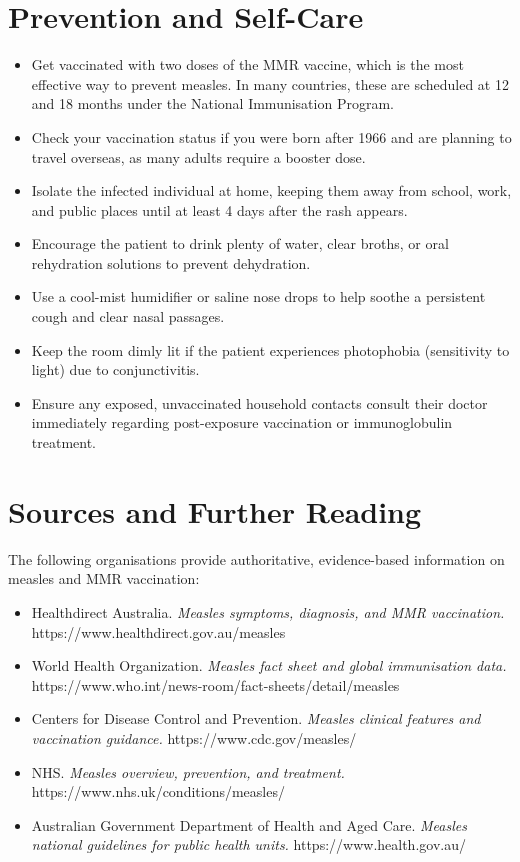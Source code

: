 \section*{Prevention and Self-Care}
\begin{itemize}
    \item Get vaccinated with two doses of the MMR vaccine, which is the most effective way to prevent measles. In many countries, these are scheduled at 12 and 18 months under the National Immunisation Program.
    \item Check your vaccination status if you were born after 1966 and are planning to travel overseas, as many adults require a booster dose.
    \item Isolate the infected individual at home, keeping them away from school, work, and public places until at least 4 days after the rash appears.
    \item Encourage the patient to drink plenty of water, clear broths, or oral rehydration solutions to prevent dehydration.
    \item Use a cool-mist humidifier or saline nose drops to help soothe a persistent cough and clear nasal passages.
    \item Keep the room dimly lit if the patient experiences photophobia (sensitivity to light) due to conjunctivitis.
    \item Ensure any exposed, unvaccinated household contacts consult their doctor immediately regarding post-exposure vaccination or immunoglobulin treatment.
\end{itemize}

\section*{Sources and Further Reading}
The following organisations provide authoritative, evidence-based information on measles and MMR vaccination:
\begin{itemize}
    \item Healthdirect Australia. \textit{Measles symptoms, diagnosis, and MMR vaccination.} https://www.healthdirect.gov.au/measles
    \item World Health Organization. \textit{Measles fact sheet and global immunisation data.} https://www.who.int/news-room/fact-sheets/detail/measles
    \item Centers for Disease Control and Prevention. \textit{Measles clinical features and vaccination guidance.} https://www.cdc.gov/measles/
    \item NHS. \textit{Measles overview, prevention, and treatment.} https://www.nhs.uk/conditions/measles/
    \item Australian Government Department of Health and Aged Care. \textit{Measles national guidelines for public health units.} https://www.health.gov.au/
\end{itemize}
